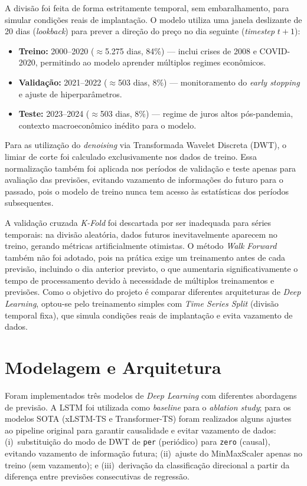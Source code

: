 \begin{itemize}
    A divisão foi feita de forma estritamente temporal, sem embaralhamento, para simular condições reais de implantação. O modelo utiliza uma janela deslizante de 20 dias (\textit{lookback}) para prever a direção do preço no dia seguinte (\textit{timestep} $t+1$):
    \begin{itemize}
        \item \textbf{Treino:} 2000--2020 ($\approx$5.275 dias, 84\%) --- inclui crises de 2008 e COVID-2020, permitindo ao modelo aprender múltiplos regimes econômicos.
        \item \textbf{Validação:} 2021--2022 ($\approx$503 dias, 8\%) --- monitoramento do \textit{early stopping} e ajuste de hiperparâmetros.
        \item \textbf{Teste:} 2023--2024 ($\approx$503 dias, 8\%) --- regime de juros altos pós-pandemia, contexto macroeconômico inédito para o modelo.
    \end{itemize}

    Para as utilização do \textit{denoising} via Transformada Wavelet Discreta (DWT), o limiar de corte foi calculado exclusivamente nos dados de treino. Essa normalização também foi aplicada nos períodos de validação e teste apenas para avaliação das previsões, evitando vazamento de informações do futuro para o passado, pois o modelo de treino nunca tem acesso às estatísticas dos períodos subsequentes.

    A validação cruzada \textit{K-Fold} foi descartada por ser inadequada para séries temporais: na divisão aleatória, dados futuros inevitavelmente aparecem no treino, gerando métricas artificialmente otimistas. O método \textit{Walk Forward} também não foi adotado, pois na prática exige um treinamento antes de cada previsão, incluindo o dia anterior previsto, o que aumentaria significativamente o tempo de processamento devido à necessidade de múltiplos treinamentos e previsões. Como o objetivo do projeto é comparar diferentes arquiteturas de \textit{Deep Learning}, optou-se pelo treinamento simples com \textit{Time Series Split} (divisão temporal fixa), que simula condições reais de implantação e evita vazamento de dados.

\end{itemize}

\section{Modelagem e Arquitetura}

Foram implementados três modelos de \textit{Deep Learning} com diferentes abordagens de previsão. A LSTM foi utilizada como \textit{baseline} para o \textit{ablation study}; para os modelos SOTA (xLSTM-TS e Transformer-TS) foram realizados alguns ajustes ao pipeline original para garantir causalidade e evitar vazamento de dados: (i)~substituição do modo de DWT de \texttt{per} (periódico) para \texttt{zero} (causal), evitando vazamento de informação futura; (ii)~ajuste do MinMaxScaler apenas no treino (sem vazamento); e (iii)~derivação da classificação direcional a partir da diferença entre previsões consecutivas de regressão.

